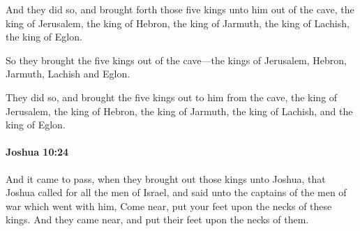 			\begin{versebox}
					\item[BHS] 
					\item[ASV] And they did so, and brought forth those five kings unto him out of the cave, the king of Jerusalem, the king of Hebron, the king of Jarmuth, the king of Lachish, the king of Eglon.
					\item[NIV] So they brought the five kings out of the cave—the kings of Jerusalem, Hebron, Jarmuth, Lachish and Eglon.
					\item[NRSV] They did so, and brought the five kings out to him from the cave, the king of Jerusalem, the king of Hebron, the king of Jarmuth, the king of Lachish, and the king of Eglon.
			\end{versebox}

		\paragraph{Joshua 10:24} %
			\label{JOSHUA-10-24}

			And it came to pass, when they brought out those kings unto Joshua, that Joshua called for all the men of Israel, and said unto the captains of the men of war which went with him, Come near, put your feet upon the necks of these kings. And they came near, and put their feet upon the necks of them.

